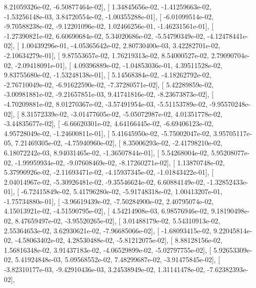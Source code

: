 \documentclass{article}
\begin{document}
          8.21059326e-02,  -6.50877464e-02],
       [  1.34845656e-02,  -1.41259663e-02,  -1.53256148e-03,
          3.84720554e-02,  -1.00355288e-01],
       [ -6.01099514e-02,  -9.70588238e-02,  -9.12201096e-02,
          1.02466256e-01,  -1.46231561e-01],
       [ -1.27390821e-02,   6.60690684e-02,   5.34020686e-02,
         -5.54790349e-02,  -4.12478441e-02],
       [  1.00439296e-01,  -4.05365642e-02,   2.80730400e-03,
          3.42282701e-02,  -2.10634279e-01],
       [  9.87553657e-02,   1.76219313e-02,   8.54000527e-02,
          2.79090704e-02,  -2.09418091e-01],
       [  4.09396889e-02,  -1.04853036e-01,   4.39511528e-02,
          9.83755680e-02,  -1.53248138e-01],
       [  5.14568384e-02,  -4.18262792e-02,  -2.76710049e-02,
         -6.91622590e-02,  -7.37280571e-02],
       [  5.42289859e-02,  -3.00981881e-02,  -9.21657851e-03,
          9.41741816e-02,  -8.23673873e-02],
       [ -4.70209881e-02,   8.01270367e-02,  -3.57491954e-03,
         -5.51153789e-02,  -9.95570248e-02],
       [  8.31572339e-02,  -3.01477605e-02,  -5.05072987e-02,
          4.01351778e-02,  -3.44835677e-02],
       [ -6.66620301e-02,   4.64166445e-02,  -6.69406123e-02,
          4.95728049e-02,  -1.24600811e-01],
       [  5.41645950e-02,  -5.75002047e-02,   3.95705117e-05,
          7.21469305e-02,  -4.75940960e-02],
       [  8.35006293e-02,  -2.41798210e-02,   6.18072242e-03,
          8.94031465e-02,  -1.36507844e-01],
       [  5.54268004e-02,   5.95208077e-02,  -1.99959934e-02,
         -9.07608469e-02,  -8.17260271e-02],
       [  1.13870748e-02,   5.37990926e-02,  -2.11693471e-02,
         -4.15937345e-02,  -1.01843422e-01],
       [  2.04014967e-02,  -5.30926481e-02,  -9.35546624e-02,
          6.60884149e-02,  -1.32852433e-01],
       [ -6.72415849e-02,   5.41796280e-02,  -5.91748318e-02,
          1.00413207e-01,  -1.75734880e-01],
       [ -3.96619439e-02,  -7.50284900e-02,   2.40795074e-02,
          4.15013921e-02,  -4.51590795e-02],
       [  4.54214908e-03,   6.98576946e-02,   9.18190498e-02,
          8.47659497e-02,  -3.95520265e-02],
       [  3.01488179e-02,   5.54310913e-02,   2.55364653e-02,
          3.62930621e-02,  -7.96685066e-02],
       [ -1.68093415e-02,   9.22045814e-02,  -4.58063402e-02,
          4.28530488e-02,  -5.81212075e-02],
       [  8.88128156e-02,   1.56816348e-02,   3.91437183e-02,
         -4.06529899e-02,  -5.02797755e-02],
       [  5.92653309e-02,   5.41924848e-03,   5.09568552e-02,
          7.48299687e-02,  -3.91475845e-02],
       [ -3.82310177e-03,  -9.42910436e-03,   3.24538949e-02,
          1.31141478e-02,  -7.62382393e-02],
\end{document}
